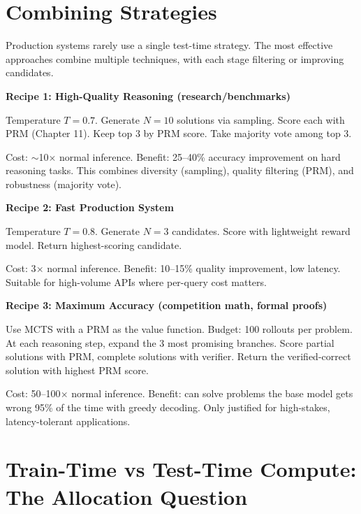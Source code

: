 \begin{chapterenv}
\section{Combining Strategies}

Production systems rarely use a single test-time strategy. The most effective approaches combine multiple techniques, with each stage filtering or improving candidates.

\begin{infobox}
\textbf{Recipe 1: High-Quality Reasoning (research/benchmarks)}

Temperature $T = 0.7$. Generate $N = 10$ solutions via sampling. Score each with PRM (Chapter 11). Keep top 3 by PRM score. Take majority vote among top 3.

Cost: $\sim$10$\times$ normal inference. Benefit: 25--40\% accuracy improvement on hard reasoning tasks. This combines diversity (sampling), quality filtering (PRM), and robustness (majority vote).
\end{infobox}

\begin{infobox}
\textbf{Recipe 2: Fast Production System}

Temperature $T = 0.8$. Generate $N = 3$ candidates. Score with lightweight reward model. Return highest-scoring candidate.

Cost: 3$\times$ normal inference. Benefit: 10--15\% quality improvement, low latency. Suitable for high-volume APIs where per-query cost matters.
\end{infobox}

\begin{infobox}
\textbf{Recipe 3: Maximum Accuracy (competition math, formal proofs)}

Use MCTS with a PRM as the value function. Budget: 100 rollouts per problem. At each reasoning step, expand the 3 most promising branches. Score partial solutions with PRM, complete solutions with verifier. Return the verified-correct solution with highest PRM score.

Cost: 50--100$\times$ normal inference. Benefit: can solve problems the base model gets wrong 95\% of the time with greedy decoding. Only justified for high-stakes, latency-tolerant applications.
\end{infobox}

\section{Train-Time vs Test-Time Compute: The Allocation Question}


\end{chapterenv}
